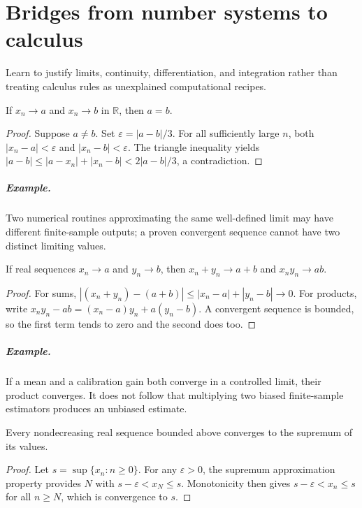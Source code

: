 \chapter{Bridges from number systems to calculus}\label{ch:bridges-analysis}
\begin{readergoal}Learn to justify limits, continuity, differentiation, and integration rather than treating calculus rules as unexplained computational recipes.\end{readergoal}

\begin{proposition}If $x_n\to a$ and $x_n\to b$ in $\mathbb R$, then $a=b$.\end{proposition}
\begin{proof}Suppose $a\neq b$. Set $\varepsilon=|a-b|/3$. For all sufficiently large $n$, both $|x_n-a|<\varepsilon$ and $|x_n-b|<\varepsilon$. The triangle inequality yields $|a-b|\leq |a-x_n|+|x_n-b|<2|a-b|/3$, a contradiction.\end{proof}
\paragraph{Example.} Two numerical routines approximating the same well-defined limit may have different finite-sample outputs; a proven convergent sequence cannot have two distinct limiting values.

\begin{proposition}If real sequences $x_n\to a$ and $y_n\to b$, then $x_n+y_n\to a+b$ and $x_ny_n\to ab$.\end{proposition}
\begin{proof}For sums, $|(x_n+y_n)-(a+b)|\leq |x_n-a|+|y_n-b|\to0$. For products, write $x_ny_n-ab=(x_n-a)y_n+a(y_n-b)$. A convergent sequence is bounded, so the first term tends to zero and the second does too.\end{proof}
\paragraph{Example.} If a mean and a calibration gain both converge in a controlled limit, their product converges. It does not follow that multiplying two biased finite-sample estimators produces an unbiased estimate.

\begin{proposition}Every nondecreasing real sequence bounded above converges to the supremum of its values.\end{proposition}
\begin{proof}Let $s=\sup\{x_n:n\geq0\}$. For any $\varepsilon>0$, the supremum approximation property provides $N$ with $s-\varepsilon<x_N\leq s$. Monotonicity then gives $s-\varepsilon<x_n\leq s$ for all $n\geq N$, which is convergence to $s$.\end{proof}
